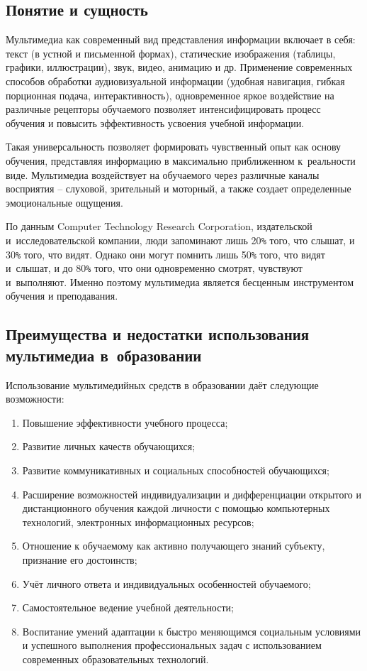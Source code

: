 \documentclass{ou}
\begin{document}
\subsection{Понятие и сущность}
Мультимедиа как современный вид представления информации включает в себя: текст (в устной и письменной формах), статические изображения (таблицы, графики, иллюстрации), звук, видео, анимацию и др. Применение современных способов обработки аудиовизуальной информации (удобная навигация, гибкая порционная подача, интерактивность), одновременное яркое воздействие на различные рецепторы обучаемого позволяет интенсифицировать процесс обучения и повысить эффективность усвоения учебной информации.

Такая универсальность позволяет формировать чувственный опыт как основу обучения, представляя информацию в максимально приближенном к~реальности виде. Мультимедиа воздействует на обучаемого через различные каналы восприятия -- слуховой, зрительный и моторный, а также создает определенные эмоциональные ощущения.

По данным Computer Technology Research Corporation, издательской и~исследовательской компании, люди запоминают лишь 20\verb|%| того, что слышат, и 30\verb|%| того, что видят. Однако они могут помнить лишь 50\verb|%| того, что видят и~слышат, и до 80\verb|%| того, что они одновременно смотрят, чувствуют и~выполняют. Именно поэтому мультимедиа является бесценным инструментом обучения и преподавания\cite{journals_stmjournals_2024}.
\subsection{Преимущества и недостатки использования мультимедиа в~образовании}
Использование мультимедийных средств в образовании даёт следующие возможности: 
\begin{enumerate}[leftmargin=0em, itemindent=3.75em, nosep, label=\arabic*)]
\item Повышение эффективности учебного процесса; 
\item Развитие личных качеств обучающихся; 
\item Развитие коммуникативных и социальных способностей обучающихся; 
\item Расширение возможностей индивидуализации и дифференциации открытого и дистанционного обучения каждой личности с помощью компьютерных технологий, электронных информационных ресурсов; 
\item Отношение к обучаемому как активно получающего знаний субъекту, признание его достоинств; 
\item Учёт личного ответа и индивидуальных особенностей обучаемого; 
\item Самостоятельное ведение учебной деятельности; 
\item Воспитание умений адаптации к быстро меняющимся социальным условиями и успешного выполнения профессиональных задач с использованием современных образовательных технологий.
\end{enumerate}
\end{document}
